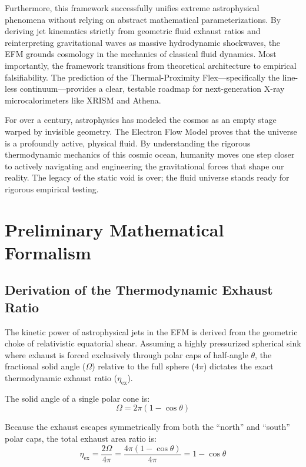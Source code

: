 \documentclass[11pt, a4paper]{article}
\begin{document}
Furthermore, this framework successfully unifies extreme astrophysical phenomena without relying on abstract mathematical parameterizations. By deriving jet kinematics strictly from geometric fluid exhaust ratios and reinterpreting gravitational waves as massive hydrodynamic shockwaves, the EFM grounds cosmology in the mechanics of classical fluid dynamics. Most importantly, the framework transitions from theoretical architecture to empirical falsifiability. The prediction of the Thermal-Proximity Flex---specifically the line-less continuum---provides a clear, testable roadmap for next-generation X-ray microcalorimeters like XRISM and Athena.

For over a century, astrophysics has modeled the cosmos as an empty stage warped by invisible geometry. The Electron Flow Model proves that the universe is a profoundly active, physical fluid. By understanding the rigorous thermodynamic mechanics of this cosmic ocean, humanity moves one step closer to actively navigating and engineering the gravitational forces that shape our reality. The legacy of the static void is over; the fluid universe stands ready for rigorous empirical testing.

\clearpage
\appendix
\section{Preliminary Mathematical Formalism}

\subsection{Derivation of the Thermodynamic Exhaust Ratio}
The kinetic power of astrophysical jets in the EFM is derived from the geometric choke of relativistic equatorial shear. Assuming a highly pressurized spherical sink where exhaust is forced exclusively through polar caps of half-angle $\theta$, the fractional solid angle ($\Omega$) relative to the full sphere ($4\pi$) dictates the exact thermodynamic exhaust ratio ($\eta_{\text{ex}}$).

The solid angle of a single polar cone is:
\begin{equation}
  \Omega = 2\pi (1 - \cos\theta)
\end{equation}

Because the exhaust escapes symmetrically from both the ``north'' and ``south'' polar caps, the total exhaust area ratio is:
\begin{equation}
  \eta_{\text{ex}} = \frac{2 \Omega}{4\pi} = \frac{4\pi (1 - \cos\theta)}{4\pi} = 1 - \cos\theta
\end{equation}
\end{document}
